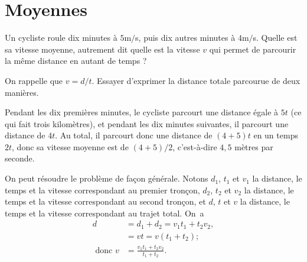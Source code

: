 

\chapter{Moyennes}


\begin{exo} Un cycliste roule dix minutes à $5$m$/$s, puis dix autres minutes à $4$m$/$s. Quelle est sa vitesse moyenne, autrement dit quelle est la vitesse $v$ qui permet de parcourir la même distance en autant de temps ?

\begin{hint} %
On rappelle que $v=d/t$. Essayer d'exprimer la distance totale parcourue de deux manières. 
\end{hint} 

\begin{sol} %
Pendant les dix premières minutes, le cycliste parcourt une distance égale à $5t$ (ce qui fait trois kilomètres), et pendant les dix minutes suivantes, il parcourt une distance de $4t$. Au total, il parcourt donc une distance de $(4+5)t$ en un temps $2t$, donc sa vitesse moyenne est de $(4+5)/2$, c'est-à-dire $4,5$ mètres par seconde.

On peut résoudre le problème de façon générale. 
Notons $d_1$, $t_1$ et $v_1$ la distance, le temps et la vitesse correspondant au premier tronçon, $d_2$, $t_2$ et $v_2$ la distance, le temps et la vitesse correspondant au second tronçon, et $d$, $t$ et $v$ la distance, le temps et la vitesse correspondant au trajet total. On~a 
\begin{align*}
d & = d_1 + d_2 = v_1t_1+t_2v_2, \\
& = vt=v(t_1+t_2);\\
\text{ donc } v & = \frac{v_1t_1+t_2v_2}{t_1+t_2}.
\end{align*}
\end{sol}

\end{exo}

